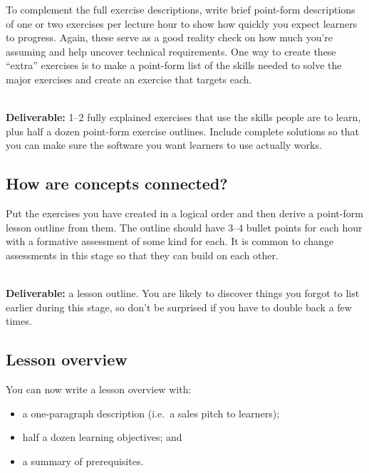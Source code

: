 To complement the full exercise descriptions,
write brief point-form descriptions of one or two exercises per lecture hour
to show how quickly you expect learners to progress.
Again,
these serve as a good reality check on how much you're assuming
and help uncover technical requirements.
One way to create these ``extra'' exercises
is to make a point-form list of the skills needed to solve the major exercises
and create an exercise that targets each.

~\\
\noindent
\textbf{Deliverable:} 1--2 fully explained exercises
that use the skills people are to learn,
plus half a dozen point-form exercise outlines.
Include complete solutions
so that you can make sure the software you want learners to use actually works.

\subsection*{How are concepts connected?}

Put the exercises you have created in a logical order
and then derive a point-form lesson outline from them.
The outline should have 3--4 bullet points for each hour
with a formative assessment of some kind for each.
It is common to change assessments in this stage
so that they can build on each other.

~\\
\noindent
\textbf{Deliverable:} a lesson outline.
You are likely to discover things you forgot to list earlier during this stage,
so don't be surprised if you have to double back a few times.

\subsection*{Lesson overview}

You can now write a lesson overview with:

\begin{itemize}

\item
  a one-paragraph description (i.e.\ a sales pitch to learners);

\item
  half a dozen learning objectives; and

\item
  a summary of prerequisites.

\end{itemize}

